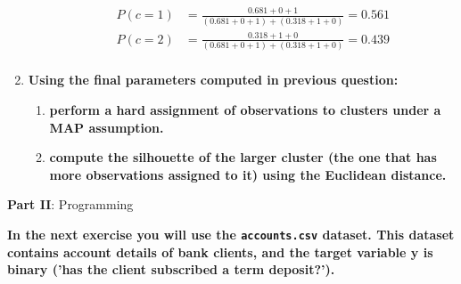\documentclass[12pt]{article}
\begin{document}
\begin{enumerate}
\begin{enumerate}[label=\arabic*)]
    \begin{equation*}
        \begin{aligned}
            P(c=1) &= \frac{0.681+0+1}{(0.681+0+1) + (0.318+1+0)} = 0.561\\
            P(c=2) &= \frac{0.318+1+0}{(0.681+0+1) + (0.318+1+0)} = 0.439\\
        \end{aligned}
    \end{equation*}

    \end{enumerate}

    \vspace{10pt}
    \item \textbf{Using the ﬁnal parameters computed in previous question:}
    \begin{enumerate}[label=\alph*)]
        \item \textbf{perform a hard assignment of observations to clusters under a MAP assumption.}
        \item \textbf{compute the silhouette of the larger cluster (the one that has more observations
        assigned to it) using the Euclidean distance.}
    \end{enumerate}
\end{enumerate}

\vspace{20pt}
\large{\textbf{Part II}: Programming}\normalsize

\vspace{20pt}
\textbf{In the next exercise you will use the \texttt{accounts.csv} dataset. This dataset contains account details
of bank clients, and the target variable y is binary ('has the client subscribed a term deposit?').}
\end{document}
